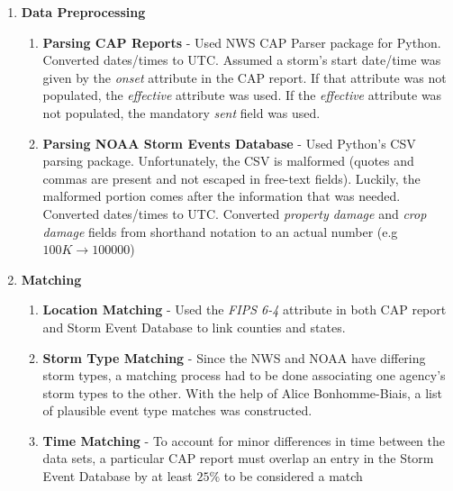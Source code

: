 \documentclass[landscape,final,paperwidth=36in,paperheight=24in,fontscale=0.55]{baposter}
\begin{document}
\begin{poster}
{
\begin{multicols*}{2}
	\setlength\multicolsep{0pt}
	\begin{enumerate}
	   \setlength{\itemindent}{-1em}
		\setlength{\itemsep}{3pt}
		\item \textbf{Data Preprocessing} 
		\begin{enumerate}[leftmargin=2em]
			\setlength{\itemindent}{-1.5em}
			\item \textbf{Parsing CAP Reports} - Used NWS CAP Parser package for Python. Converted dates/times to UTC. Assumed a storm's start date/time was given by the \textit{onset} attribute in the CAP report. If that attribute was not populated, the \textit{effective} attribute was used. If the \textit{effective} attribute was not populated, the mandatory \textit{sent} field was used.
			\item \textbf{Parsing NOAA Storm Events Database} - Used Python's CSV parsing package. Unfortunately, the CSV is malformed (quotes and commas are present and not escaped in free-text fields). Luckily, the malformed portion comes after the information that was needed. Converted dates/times to UTC. Converted \textit{property damage} and \textit{crop damage} fields from shorthand notation to an actual number (e.g $100K \rightarrow 100000$)
		\end{enumerate}

		\item \textbf{Matching}
		\begin{enumerate}[leftmargin=2em]
			\setlength{\itemindent}{-1.5em}
			\item \textbf{Location Matching} - Used the \textit{FIPS 6-4} attribute in both CAP report and Storm Event Database to link counties and states.
			\item \textbf{Storm Type Matching} - Since the NWS and NOAA have differing storm types, a matching process had to be done associating one agency's storm types to the other. With the help of Alice Bonhomme-Biais, a list of plausible event type matches was constructed.
			\item \textbf{Time Matching} - To account for minor differences in time between the data sets, a particular CAP report must overlap an entry in the Storm Event Database by at least $25\%$ to be considered a match
		\end{enumerate}


\end{enumerate}
\end{multicols*}}
\end{poster}
\end{document}
